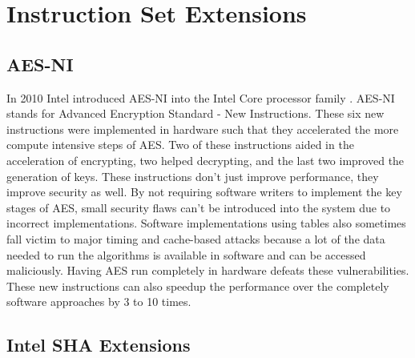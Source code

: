 \documentclass[journal]{IEEEtran}
\begin{document}
\section{Instruction Set Extensions}

\subsection{AES-NI}

In 2010 Intel introduced AES-NI into the Intel Core processor family \cite{AES1} \cite{AES2}.  AES-NI stands for Advanced Encryption Standard - New Instructions.  These six new instructions were implemented in hardware such that they accelerated the more compute intensive steps of AES.  Two of these instructions aided in the acceleration of encrypting, two helped decrypting, and the last two improved the generation of keys.  These instructions don't just improve performance, they improve security as well.  By not requiring software writers to implement the key stages of AES, small security flaws can't be introduced into the system due to incorrect implementations.  Software implementations using tables also sometimes fall victim to major timing and cache-based attacks because a lot of the data needed to run the algorithms is available in software and can be accessed maliciously.  Having AES run completely in hardware defeats these vulnerabilities. These new instructions can also speedup the performance over the completely software approaches by 3 to 10 times.

\subsection{Intel SHA Extensions}


%
%
\end{document}
